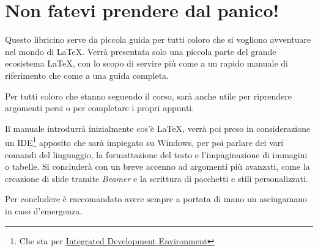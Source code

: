 \chapter*{Non fatevi prendere dal panico!}

Questo libricino serve da piccola guida per tutti coloro che si vogliono 
avventuare nel mondo di \LaTeX. Verrà presentata solo una piccola parte del 
grande ecosistema \LaTeX, con lo scopo di servire più come a un rapido manuale 
di riferimento che come a una guida completa.

Per tutti coloro che stanno seguendo il corso, sarà anche utile per riprendere 
argomenti persi o per completare i propri appunti.

Il manuale introdurrà inizialmente cos'è \LaTeX, verrà poi preso in 
considerazione un IDE\footnote{Che sta per 
\href{https://it.wikipedia.org/wiki/Integrated_development_environment}{ 
Integrated Development Environment}} apposito che sarà impiegato su Windows, 
per poi parlare dei vari comandi del linguaggio, la formattazione del testo e 
l'impaginazione di immagini o tabelle. Si concluderà con un breve accenno ad 
argomenti più avanzati, come la creazione di slide tramite \textit{Beamer} e la 
scrittura di pacchetti e stili personalizzati.

Per concludere è raccomandato avere sempre a portata di mano un asciugamano in 
caso d'emergenza.